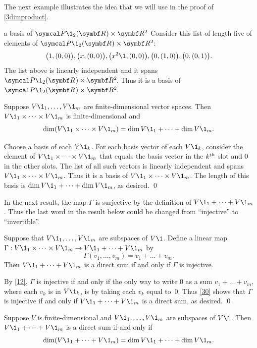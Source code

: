 The next example illustrates the idea that we will use in the proof of \ref{3dimproduct}.

\begin{example}{a basis of\/ $\P\1_2(\R{}) \times \R2$}
Consider this list of length five of elements of $\P\1_2(\R{}) \times \R2$:
\[
\bigl(1, (0,0) \bigr), \bigl(x,(0,0) \bigr), \bigl(x^2\1, (0,0) \bigr), \bigl(0, (1,0) \bigr), \bigl(0, (0, 1)\bigr).
\]
The list above is linearly independent and it spans $\P\1_2(\R{}) \times \RR2$. Thus it is a basis of $\P\1_2(\R{}) \times \RR2$.
\end{example}

{Suppose $V\1_1, \dots, V\1_m$ are finite-dimensional vector spaces. Then $V\1_1 \times \dots \times V\1_m$  is finite-dimensional and
\[
\dim (V\1_1 \times \dots \times V\1_m) = \dim V\1_1 + \dots + \dim V\1_m.
\]}

\proof
Choose a basis of each $V\1_k$. For each basis vector of each $V\1_k$, consider the element of $V\1_1 \times \dots \times V\1_m$ that equals the basis vector in the $k^{\text{{th}}}$ slot and $0$ in the other slots. The list of all such vectors is linearly independent and spans $V\1_1 \times \dots \times V\1_m$. Thus it is a basis of $V\1_1 \times \dots \times V\1_m$. The length of this basis is $\dim V\1_1 + \dots + \dim V\1_m$, as desired.
\qed

In the next result, the map $\Gamma$ is surjective by the definition of $V\1_1 + \dots + V\1_m$. Thus the last word in the result below could be changed from ``injective'' to ``invertible''\!.

{Suppose that $V\1_1, \dots, V\1_m$ are subspaces of $V\1$. Define a linear map \mbox{$\Gamma: V\1_1 \times \dots \times V\1_m \to V\1_1 + \dots + V\1_m$} by
\[
\Gamma(v_1, \dots, v_m) = v_1 + \dots + v_m.
\]
Then $V\1_1 + \dots + V\1_m$ is a direct sum if and only if $\Gamma$ is injective.
}

\proof
By \ref{12}, $\Gamma$ is injective if and only if the only way to write $0$ as a sum $v_1 + \dots + v_m$, where each $v_k$ is in $V\1_k$, is by taking each $v_k$ equal to~$0$. Thus \ref{30} shows that $\Gamma$ is injective if and only if $V\1_1 + \dots + V\1_m$ is a direct sum, as desired. \qed

{Suppose $V$ is finite-dimensional and $V\1_1, \dots, V\1_m$ are subspaces of $V\1$. Then $V\1_1 + \dots + V\1_m$ is a direct sum if and only if
\[
\dim(V\1_1 + \dots + V\1_m) = \dim V\1_1 + \dots + \dim V\1_m.
\]
}

